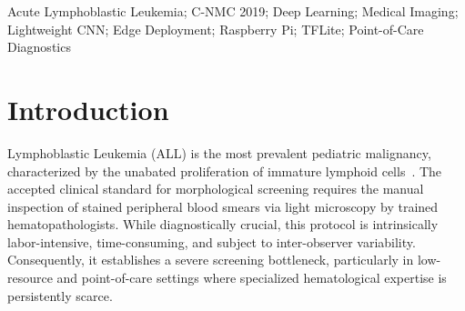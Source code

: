 \documentclass[journal]{IEEEtran}
\begin{document}
    \maketitle

    \begin{abstract}
Acute Lymphoblastic Leukemia (ALL) diagnosis relies predominantly on manual peripheral blood smear microscopy, a labor-intensive process that creates significant screening bottlenecks in low-resource and point-of-care settings. This work proposes an edge-native diagnostic system designed for real-time leukemia screening, operating independently of cloud infrastructure. The end-to-end pipeline integrates a hybrid segmentation framework combining K-Means clustering, watershed-based clump separation, and Segment Anything Model (SAM) refinement to extract standardized cell crops. Classification is performed using a lightweight convolutional neural network ensemble comprising MobileNetV3 and EfficientNet backbones, optimized through progressive unfreezing and imbalance-aware focal learning. The model is quantized to INT8 precision for deployment on a Raspberry Pi 5. Under subject-disjoint cross-validation, the classifier achieves an AUC of 0.959 and a sensitivity of 95.22\%, prioritizing clinically relevant recall. Post-quantization, the model size is reduced to 3.38 MB, enabling an isolated inference latency of under 50 ms per cell. This work presents a fully deployable edge-native leukemia screening pipeline with clinically grounded validation. The results demonstrate the feasibility of decentralized, real-time screening in resource-constrained environments, positioning the system as an assistive clinical decision support tool rather than a diagnostic replacement.
\end{abstract}

    \begin{IEEEkeywords}
    Acute Lymphoblastic Leukemia; C-NMC 2019; Deep Learning; Medical Imaging; Lightweight CNN; Edge Deployment; Raspberry Pi; TFLite; Point-of-Care Diagnostics
    \end{IEEEkeywords}

    \section{Introduction}
 Lymphoblastic Leukemia (ALL) is the most prevalent pediatric malignancy, characterized by the unabated proliferation of immature lymphoid cells~\cite{b_bray2018}. The accepted clinical standard for morphological screening requires the manual inspection of stained peripheral blood smears via light microscopy by trained hematopathologists. While diagnostically crucial, this protocol is intrinsically labor-intensive, time-consuming, and subject to inter-observer variability. Consequently, it establishes a severe screening bottleneck, particularly in low-resource and point-of-care settings where specialized hematological expertise is persistently scarce.
\end{document}
